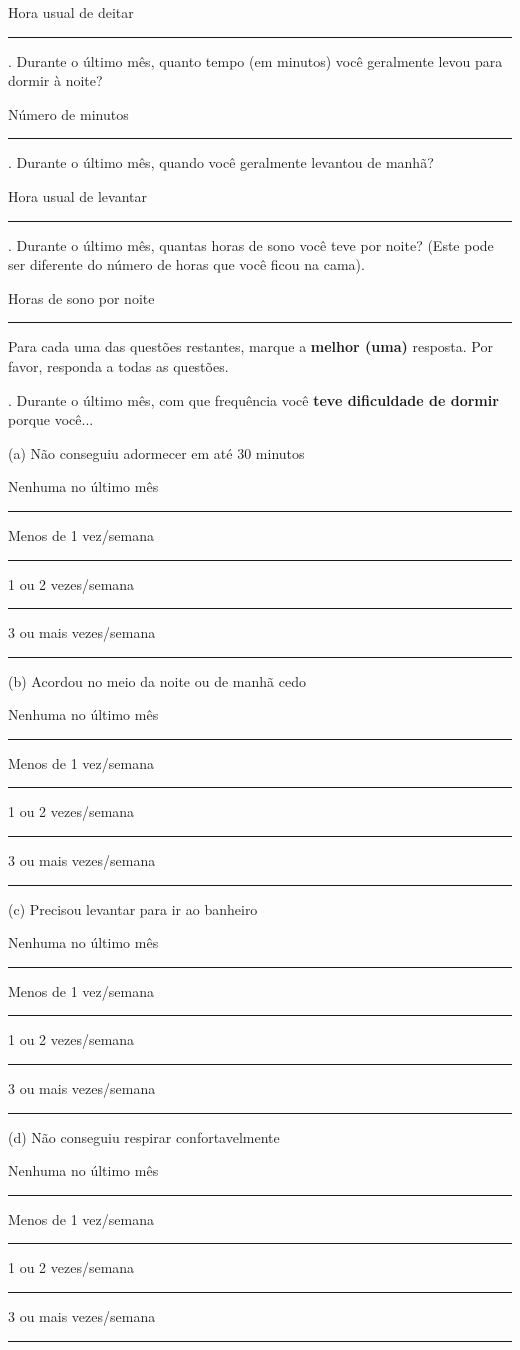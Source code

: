 \documentclass[chapter=TITLE,
               oneside,
               12pt,
               a4paper,
               english,
               brazil]{abntex2}    %
\begin{document}
\begin{anexosenv}
    Hora usual de deitar \rule{4cm}{0.4pt}

    . Durante o último mês, quanto tempo (em minutos) você geralmente levou
    para dormir à noite?

    Número de minutos \rule{4cm}{0.4pt}

    . Durante o último mês, quando você geralmente levantou de manhã?

    Hora usual de levantar \rule{4cm}{0.4pt}

    . Durante o último mês, quantas horas de sono você teve por noite? (Este pode
    ser diferente do número de horas que você ficou na cama).

    Horas de sono por noite \rule{4cm}{0.4pt}

    \noindent
    Para cada uma das questões restantes, marque a \textbf{melhor (uma)} resposta.
    Por favor, responda a todas as questões.

    . Durante o último mês, com que frequência você \textbf{teve dificuldade de dormir}
    porque você...

    \noindent
    (a) Não conseguiu adormecer em até 30 minutos

    Nenhuma no último mês \rule{0.75cm}{0.4pt} Menos de 1 vez/semana \rule{0.75cm}{0.4pt}

    1 ou 2 vezes/semana \rule{0.75cm}{0.4pt} 3 ou mais vezes/semana \rule{0.75cm}{0.4pt}

    \noindent
    (b) Acordou no meio da noite ou de manhã cedo

    Nenhuma no último mês \rule{0.75cm}{0.4pt} Menos de 1 vez/semana \rule{0.75cm}{0.4pt}

    1 ou 2 vezes/semana \rule{0.75cm}{0.4pt} 3 ou mais vezes/semana \rule{0.75cm}{0.4pt}

    \noindent
    (c) Precisou levantar para ir ao banheiro

    Nenhuma no último mês \rule{0.75cm}{0.4pt} Menos de 1 vez/semana \rule{0.75cm}{0.4pt}

    1 ou 2 vezes/semana \rule{0.75cm}{0.4pt} 3 ou mais vezes/semana \rule{0.75cm}{0.4pt}

    \noindent
    (d) Não conseguiu respirar confortavelmente

    Nenhuma no último mês \rule{0.75cm}{0.4pt} Menos de 1 vez/semana \rule{0.75cm}{0.4pt}

    1 ou 2 vezes/semana \rule{0.75cm}{0.4pt} 3 ou mais vezes/semana \rule{0.75cm}{0.4pt}


\end{anexosenv}
\end{document}
